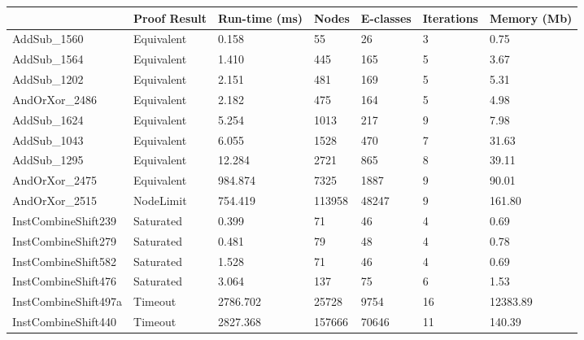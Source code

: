 \begin{tabular}{lllllll}
\toprule
 & Proof Result & Run-time (ms) & Nodes & E-classes & Iterations & Memory (Mb) \\
\midrule
AddSub\_1560 & Equivalent & 0.158 & 55 & 26 & 3 & 0.75 \\
AddSub\_1564 & Equivalent & 1.410 & 445 & 165 & 5 & 3.67 \\
AddSub\_1202 & Equivalent & 2.151 & 481 & 169 & 5 & 5.31 \\
AndOrXor\_2486 & Equivalent & 2.182 & 475 & 164 & 5 & 4.98 \\
AddSub\_1624 & Equivalent & 5.254 & 1013 & 217 & 9 & 7.98 \\
AddSub\_1043 & Equivalent & 6.055 & 1528 & 470 & 7 & 31.63 \\
AddSub\_1295 & Equivalent & 12.284 & 2721 & 865 & 8 & 39.11 \\
AndOrXor\_2475 & Equivalent & 984.874 & 7325 & 1887 & 9 & 90.01 \\
AndOrXor\_2515 & NodeLimit & 754.419 & 113958 & 48247 & 9 & 161.80 \\
InstCombineShift239 & Saturated & 0.399 & 71 & 46 & 4 & 0.69 \\
InstCombineShift279 & Saturated & 0.481 & 79 & 48 & 4 & 0.78 \\
InstCombineShift582 & Saturated & 1.528 & 71 & 46 & 4 & 0.69 \\
InstCombineShift476 & Saturated & 3.064 & 137 & 75 & 6 & 1.53 \\
InstCombineShift497a & Timeout & 2786.702 & 25728 & 9754 & 16 & 12383.89 \\
InstCombineShift440 & Timeout & 2827.368 & 157666 & 70646 & 11 & 140.39 \\
\bottomrule
\end{tabular}
